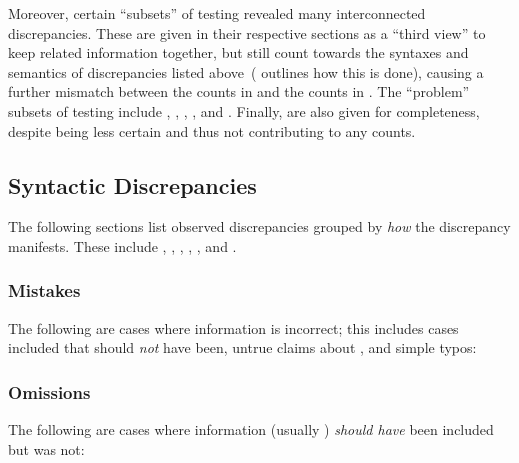 Moreover, certain ``subsets'' of testing revealed many interconnected
discrepancies. These are given in their respective sections as a ``third view''
to keep related information together, but still count towards the syntaxes and
semantics of discrepancies listed above\ifnotpaper\ (
    outlines how this is done)\fi, causing a further mismatch between the counts
in  and the counts in . The ``problem'' subsets of testing include
, \ifnotpaper{}, \fi
{}, , and .
\ifnotpaper Finally,  are also given for completeness,
    despite being less certain and thus not contributing to any counts.

    \begin{bigLandscape}
        \sntxDiscrepsTable{}
        \smntcDiscrepsTable{}
    \end{bigLandscape}

     \fi

\subsection{Syntactic Discrepancies}
\label{sntxDiscreps}

The following sections list observed discrepancies grouped by \emph{how} the
discrepancy manifests. These include , ,
, , , and \reduns{}.

\subsubsection{Mistakes}
\label{wrong}
The following are cases where information is incorrect; this includes cases
\terms{} included that should \emph{not} have been, untrue claims about
\cites{}, and simple typos:



\subsubsection{Omissions}
\label{miss}
The following are cases where information (usually ) \emph{should have}
been included but was not:



